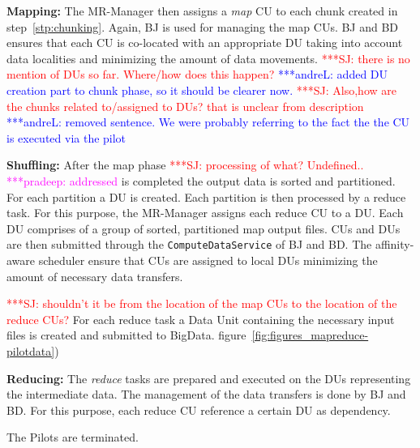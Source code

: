 \documentclass{acm_proc_article-sp}
\newcommand{\jhanote}[1]{ {\textcolor{red} { ***SJ: #1 }}}
\newcommand{\alnote}[1]{ {\textcolor{blue} { ***andreL: #1 }}}
\newcommand{\pnote}[1]{ {\textcolor{magenta} { ***pradeep: #1 }}}
\newcommand{\alnote}[1]{}
\newcommand{\pnote}[1]{}
\newcommand{\jhanote}[1]{}
\newcommand{\pilots}{Pilots\xspace}
\newcommand{\mrmg}{MR-Manager\xspace}
\newcommand{\cus}{CUs\xspace}
\newcommand{\du}{DU\xspace}
\newcommand{\dus}{DUs\xspace}
\begin{document}
\begin{compactenum}[A.]
\item \textbf{Mapping:} The \mrmg then assigns a {\it map} CU to each chunk 
created in step~\ref{stp:chunking}. Again, BJ is used for managing the map CUs. BJ
and BD ensures that each CU is co-located with an appropriate DU taking into account data localities and minimizing the amount of data movements. \jhanote{there is no
    mention of DUs so far. Where/how does this happen?} \alnote{added DU 
    creation part to chunk phase, so it should be clearer now.}
\jhanote{Also,how are the chunks related to/assigned to DUs? that is unclear
    from description}\alnote{removed sentence. We were probably referring to the fact the the CU is executed via the pilot}
	
\item \textbf{Shuffling:} %
   After the map phase \jhanote{processing of what? Undefined..} \pnote{addressed}is completed
   the output data is sorted and partitioned. For each partition a \du is
   created. Each partition is then processed by a reduce task. For this purpose, 
   the \mrmg assigns each reduce CU to a DU. Each DU comprises of a
   group of sorted, partitioned map output files. \cus and \dus are then
   submitted through the \texttt{ComputeDataService} of BJ and BD. The 
   affinity-aware scheduler ensure that \cus are assigned to local \dus minimizing the amount
   of necessary data transfers.

\jhanote{shouldn't it
    be from the location of the map CUs to the location of the reduce
    CUs?} For each reduce task a Data Unit containing the necessary
  input files is created and submitted to BigData. %
  figure~\ref{fig:figures_mapreduce-pilotdata})
		
	
\item \textbf{Reducing:} The {\it reduce} tasks are prepared and
  executed on the DUs representing the intermediate data.
  The management of the data transfers is done by BJ and BD. For this
  purpose, each reduce CU reference a certain DU as dependency.
	
\item The \pilots are terminated.

\end{compactenum}
\end{document}
